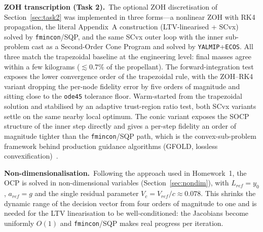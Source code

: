 \documentclass[../main.tex]{subfiles}
\begin{document}
\textbf{ZOH transcription (Task 2).}\ The optional ZOH discretisation of Section~\ref{sec:task2} was implemented in three forms---a nonlinear ZOH with RK4 propagation, the literal Appendix~A construction (LTV-linearised + SCvx) solved by \texttt{fmincon}/SQP, and the same SCvx outer loop with the inner sub-problem cast as a Second-Order Cone Program and solved by \texttt{YALMIP}+\texttt{ECOS}. All three match the trapezoidal baseline at the engineering level: final masses agree within a few kilograms ($\lesssim 0.7\%$ of the propellant). The forward-integration test exposes the lower convergence order of the trapezoidal rule, with the ZOH--RK4 variant dropping the per-node fidelity error by five orders of magnitude and sitting close to the \texttt{ode45} tolerance floor. Warm-started from the trapezoidal solution and stabilised by an adaptive trust-region ratio test, both SCvx variants settle on the same nearby local optimum. The conic variant exposes the SOCP structure of the inner step directly and gives a per-step fidelity an order of magnitude tighter than the \texttt{fmincon}/SQP path, which is the convex-sub-problem framework behind production guidance algorithms (GFOLD, lossless convexification)~\cite{acikmese2007}.

\textbf{Non-dimensionalisation.}\ Following the approach used in Homework~1, the OCP is solved in non-dimensional variables (Section~\ref{sec:nondim}), with $L_{ref} = y_0$, $a_{ref} = g$ and the single residual parameter $V_c = V_{ref}/c \approx 0.078$. This shrinks the dynamic range of the decision vector from four orders of magnitude to one and is needed for the LTV linearisation to be well-conditioned: the Jacobians become uniformly $O(1)$ and \texttt{fmincon}/SQP makes real progress per iteration.
\end{document}
